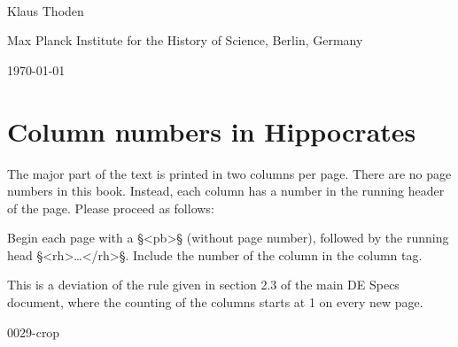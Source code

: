 \documentclass[fontsize=11pt, paper=a4, 
DIV15,
normalheadings,
parskip=half-, 
pointlessnumbers]{scrartcl}
\begin{document}
\begin{center}
{} \\[5mm]
\large Klaus Thoden

\normalsize Max Planck Institute for the History of Science, Berlin, Germany

\today
\end{center}


\section{Column numbers in Hippocrates}

The major part of the text is printed in two columns per page. There
are no page numbers in this book. Instead, each column has a number in
the running header of the page. Please proceed as follows:

\begin{mainrule}
Begin each page with a §<pb>§ (without page number), followed by the
running head §<rh>…</rh>§. Include the number of the column in the
column tag.
\end{mainrule}

\begin{clarification}
This is a deviation of the rule given in section 2.3 of the
main DE Specs document, where the counting of the columns starts at 1 on every
new page.
\end{clarification}

\begin{sampleImage}{0029-crop}
\end{sampleImage}
\end{document}
